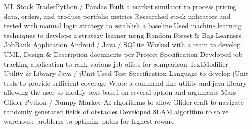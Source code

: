 %
%
%
%
\justifiedsubsection%
{ML Stock Trader}{Python / Pandas}
%
\workitemsThree%
{Built a market similator to process pricing data, orders, and produce portfolio metrics}
{Researched stock indicators and tested with manual logic strategy to establish a baseline}
{Used machine learning techniques to develope a strategy learner using Random Forest \& Bag Learners}
%
%
%
%
\justifiedsubsection%
{JobRank Application}
{Android / Java / SQLite}
%
\workitemsTwo%
{Worked with a team to develop UML, Design \& Description documents per Project Specification}
{Developed job tracking application to rank various job offers for comparison}
%
%
%
%
\justifiedsubsection%
{TextModifier Utility \& Library}
{Java / jUnit}
%
\workitemsTwo%
{Used Test Specification Language to develop jUnit tests to provide sufficient coverage}
{Wrote a command line utility and java library allowing the user to modify text based on several option and arguments}
%
%
%
%
\justifiedsubsection%
{Mars Glider}
{Python / Numpy}
%
\workitemsTwo%
{Markov AI algorithms to allow Glider craft to navigate randomly generated fields of obstacles}
{Developed SLAM algorithm to solve warehouse problems to optimize paths for highest reward}
%
%
%
%